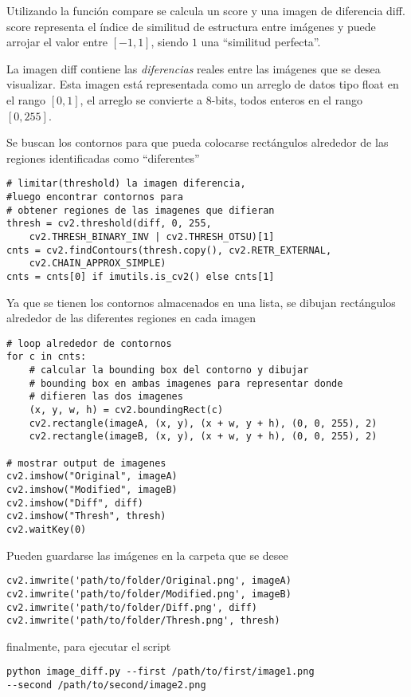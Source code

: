 \documentclass[a4paper,openright,12pt]{book}
\begin{document}
Utilizando la función \textsf{compare} se calcula un \textsf{score} y una imagen de diferencia \textsf{diff}. \textsf{score} representa el índice de similitud de estructura entre imágenes y puede arrojar el valor entre $[-1,1]$, siendo $1$ una ``similitud perfecta''.

La imagen \textsf{diff} contiene las \textit{diferencias} reales entre las imágenes que se desea visualizar. Esta imagen está representada como un arreglo de datos tipo \textsf{float} en el rango $[0,1]$, el arreglo se convierte a 8-bits, todos enteros en el rango $[0,255]$. 

Se buscan los contornos para que pueda colocarse rectángulos alrededor de las regiones identificadas como ``diferentes''
\begin{verbatim}
# limitar(threshold) la imagen diferencia, 
#luego encontrar contornos para
# obtener regiones de las imagenes que difieran
thresh = cv2.threshold(diff, 0, 255,
	cv2.THRESH_BINARY_INV | cv2.THRESH_OTSU)[1]
cnts = cv2.findContours(thresh.copy(), cv2.RETR_EXTERNAL,
	cv2.CHAIN_APPROX_SIMPLE)
cnts = cnts[0] if imutils.is_cv2() else cnts[1]
\end{verbatim}

Ya que se tienen los contornos almacenados en una lista, se dibujan rectángulos alrededor de las diferentes regiones en cada imagen
\begin{verbatim}
# loop alrededor de contornos
for c in cnts:
	# calcular la bounding box del contorno y dibujar 
	# bounding box en ambas imagenes para representar donde 
	# difieren las dos imagenes
	(x, y, w, h) = cv2.boundingRect(c)
	cv2.rectangle(imageA, (x, y), (x + w, y + h), (0, 0, 255), 2)
	cv2.rectangle(imageB, (x, y), (x + w, y + h), (0, 0, 255), 2)
 
# mostrar output de imagenes
cv2.imshow("Original", imageA)
cv2.imshow("Modified", imageB)
cv2.imshow("Diff", diff)
cv2.imshow("Thresh", thresh)
cv2.waitKey(0)
\end{verbatim}

Pueden guardarse las imágenes en la carpeta que se desee
\begin{verbatim}
cv2.imwrite('path/to/folder/Original.png', imageA)
cv2.imwrite('path/to/folder/Modified.png', imageB)
cv2.imwrite('path/to/folder/Diff.png', diff)
cv2.imwrite('path/to/folder/Thresh.png', thresh)
\end{verbatim}

finalmente, para ejecutar el script
\begin{verbatim}
python image_diff.py --first /path/to/first/image1.png
--second /path/to/second/image2.png
\end{verbatim}
\end{document}
